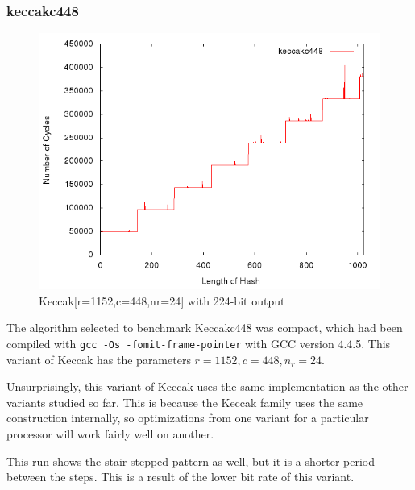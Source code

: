 \subsubsection{keccakc448}
\begin{figure}[H]
    \begin{center}
        \includegraphics[scale=0.5]{images/keccakc448.png} 
        \caption{Keccak[r=1152,c=448,nr=24] with 224-bit output}
    \end{center}
\end{figure}

The algorithm selected to benchmark Keccakc448 was compact, which had been
compiled with \texttt{gcc -Os -fomit-frame-pointer} with GCC version 4.4.5. This
variant of Keccak has the parameters $r=1152,c=448,n_r=24$.

Unsurprisingly, this variant of Keccak uses the same implementation as the other
variants studied so far. This is because the Keccak family uses the same
construction internally, so optimizations from one variant for a particular
processor will work fairly well on another. 

This run shows the stair stepped pattern as well, but it is a shorter period
between the steps. This is a result of the lower bit rate of this variant.


